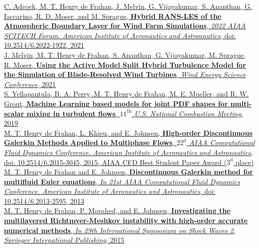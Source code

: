 \documentclass[11pt,letterpaper]{article}
\newcommand{\raisedrule}[2][0em]{\leaders\hbox{\rule[#1]{1pt}{#2}}\hfill}
\newcommand*{\sectionfont}{\Large\sffamily\mdseries\upshape}
\begin{document}
\href{https://arc.aiaa.org/doi/abs/10.2514/6.2022-1922}{C. Adcock, M. T. Henry de Frahan, J. Melvin, G. Vijayakumar, S. Ananthan, G. Iaccarino, R. D. Moser, and M. Sprague, \textbf{Hybrid RANS-LES of the Atmospheric Boundary Layer for Wind Farm Simulations}, \textit{2022 AIAA SCITECH Forum. American Institute of Aeronautics and Astronautics}, doi: 10.2514/6.2022-1922, 2021}\\[2ex]%
\href{}{J. Melvin, M. T. Henry de Frahan, S. Ananthan, G. Vijayakumar, M. Sprague, R. Moser, \textbf{Using the Active Model Split Hybrid Turbulence Model for the Simulation of Blade-Resolved Wind Turbines}, \textit{Wind Energy Science Conference}, 2021}\\[2ex]%
\href{}{S. Yellapantula, B. A. Perry, M. T. Henry de Frahan, M. E. Mueller, and R. W. Grout, \textbf{Machine Learning based models for joint PDF shapes for multi-scalar mixing in turbulent flows}, \textit{$11^{\text{th}}$ U.S. National Combustion Meeting}, 2019}\\[2ex]%
\href{http://arc.aiaa.org/doi/pdf/10.2514/6.2015-3045}{M. T. Henry de Frahan, L. Khieu, and E. Johnsen, \textbf{High-order Discontinuous Galerkin Methods Applied to Multiphase Flows}, \textit{$22^{\text{d}}$ AIAA Computational Fluid Dynamics Conference. American Institute of Aeronautics and Astronautics}, doi: 10.2514/6.2015-3045, 2015, AIAA CFD Best Student Paper Award ($3^{\text{d}}$ place)}\\[2ex]%
\href{http://arc.aiaa.org/doi/pdf/10.2514/6.2013-2595}{M. T. Henry de Frahan and E. Johnsen, \textbf{Discontinuous Galerkin method for multifluid Euler equations}, \textit{In 21st AIAA Computational Fluid Dynamics Conference. American Institute of Aeronautics and Astronautics}, doi: 10.2514/6.2013-2595, 2013}\\[2ex]%
\href{https://books.google.com/books?id=6GgnCgAAQBAJ&pg=PA1095&lr=&source=gbs_selected_pages&cad=2#v=onepage&q&f=false}{M. T. Henry de Frahan, P. Movahed, and E. Johnsen, \textbf{Investigating the multilayered Richtmyer-Meshkov instability with high-order accurate numerical methods}, \textit{In 29th International Symposium on Shock Waves 2, Springer International Publishing}, 2015}\\[3ex]%
%
%
%
%
\end{document}
